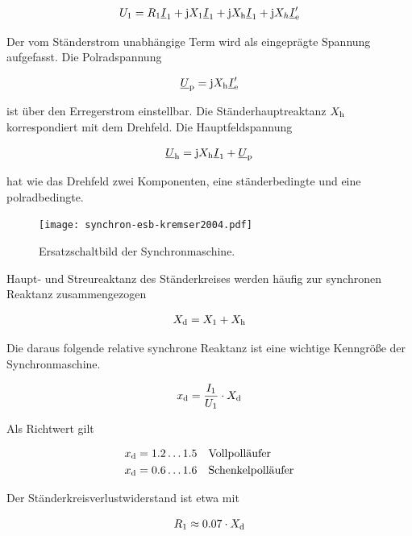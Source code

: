 \begin{align}
U_{\mathrm{1}} = R_{\mathrm{1}}\underline{I}_{\mathrm{1}} + \mathrm{j}X_{\mathrm{1}}\underline{I}_{\mathrm{1}} + \mathrm{j}X_{\mathrm{h}}\underline{I}_{\mathrm{1}} + \mathrm{j}X_{h}\underline{I}'_{\mathrm{e}}
\end{align}

Der vom Ständerstrom unabhängige Term wird als eingeprägte Spannung aufgefasst.
Die Polradspannung

\begin{align}
\underline{U}_{\mathrm{p}} = \mathrm{j}X_{\mathrm{h}}\underline{I}'_{\mathrm{e}}
\end{align}

ist über den Erregerstrom einstellbar.
Die Ständerhauptreaktanz $X_{\mathrm{h}}$ korrespondiert mit dem Drehfeld.
Die Hauptfeldspannung

\begin{align}
\underline{U}_{\mathrm{h}} = \mathrm{j} X_{\mathrm{h}} \underline{I}_{\mathrm{1}} + \underline{U}_{\mathrm{p}}
\end{align}

hat wie das Drehfeld zwei Komponenten, eine ständerbedingte und eine polradbedingte.

\begin{figure}[!htb]
\centering
\texttt{[image: synchron-esb-kremser2004.pdf]}
\label{fig:esb-kremser}
\caption{Ersatzschaltbild der Synchronmaschine.}
\end{figure}

Haupt- und Streureaktanz des Ständerkreises werden häufig zur synchronen Reaktanz zusammengezogen

\begin{align}
X_{\mathrm{d}} = X_{\mathrm{1}} + X_{\mathrm{h}}
\end{align}

Die daraus folgende relative synchrone Reaktanz ist eine wichtige Kenngröße der Synchronmaschine.

\begin{align}
x_{\mathrm{d}} = \frac{I_{\mathrm{1}}}{U_{\mathrm{1}}}\cdot X_{\mathrm{d}}
\end{align}

Als Richtwert gilt

\begin{align*}
x_{\mathrm{d}} &= 1.2 \ldots 1.5\quad\text{Vollpolläufer} \\
x_{\mathrm{d}} &= 0.6 \ldots 1.6\quad\text{Schenkelpolläufer}
\end{align*}

Der Ständerkreisverlustwiderstand ist etwa mit 

\begin{align}
R_{\mathrm{1}} \approx 0.07\cdot X_{\mathrm{d}}
\end{align}

